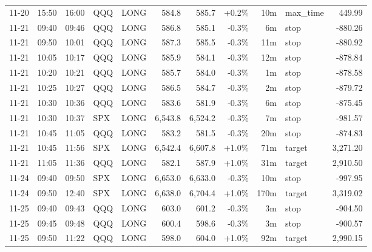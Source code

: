 \documentclass[11pt,a4paper,twoside]{article}
\begin{document}
\begin{center}
\begin{longtable}{>{\color{txtmain}}l l l l l r r r r >{\color{txtmain}}l r}
11-20 & 15:50 & 16:00 & QQQ & LONG & 584.8 & 585.7 & \textcolor{wingreen}{+0.2\%} & 10m & max\_time & \textcolor{wingreen}{449.99} \\
11-21 & 09:40 & 09:46 & QQQ & LONG & 586.8 & 585.1 & \textcolor{lossred}{-0.3\%} & 6m & stop & \textcolor{lossred}{-880.26} \\
11-21 & 09:50 & 10:01 & QQQ & LONG & 587.3 & 585.5 & \textcolor{lossred}{-0.3\%} & 11m & stop & \textcolor{lossred}{-880.92} \\
11-21 & 10:05 & 10:17 & QQQ & LONG & 585.9 & 584.1 & \textcolor{lossred}{-0.3\%} & 12m & stop & \textcolor{lossred}{-878.84} \\
11-21 & 10:20 & 10:21 & QQQ & LONG & 585.7 & 584.0 & \textcolor{lossred}{-0.3\%} & 1m & stop & \textcolor{lossred}{-878.58} \\
11-21 & 10:25 & 10:27 & QQQ & LONG & 586.5 & 584.7 & \textcolor{lossred}{-0.3\%} & 2m & stop & \textcolor{lossred}{-879.72} \\
11-21 & 10:30 & 10:36 & QQQ & LONG & 583.6 & 581.9 & \textcolor{lossred}{-0.3\%} & 6m & stop & \textcolor{lossred}{-875.45} \\
11-21 & 10:30 & 10:37 & SPX & LONG & 6,543.8 & 6,524.2 & \textcolor{lossred}{-0.3\%} & 7m & stop & \textcolor{lossred}{-981.57} \\
11-21 & 10:45 & 11:05 & QQQ & LONG & 583.2 & 581.5 & \textcolor{lossred}{-0.3\%} & 20m & stop & \textcolor{lossred}{-874.83} \\
11-21 & 10:45 & 11:56 & SPX & LONG & 6,542.4 & 6,607.8 & \textcolor{wingreen}{+1.0\%} & 71m & target & \textcolor{wingreen}{3,271.20} \\
11-21 & 11:05 & 11:36 & QQQ & LONG & 582.1 & 587.9 & \textcolor{wingreen}{+1.0\%} & 31m & target & \textcolor{wingreen}{2,910.50} \\
11-24 & 09:40 & 09:50 & SPX & LONG & 6,653.0 & 6,633.0 & \textcolor{lossred}{-0.3\%} & 10m & stop & \textcolor{lossred}{-997.95} \\
11-24 & 09:50 & 12:40 & SPX & LONG & 6,638.0 & 6,704.4 & \textcolor{wingreen}{+1.0\%} & 170m & target & \textcolor{wingreen}{3,319.02} \\
11-25 & 09:40 & 09:43 & QQQ & LONG & 603.0 & 601.2 & \textcolor{lossred}{-0.3\%} & 3m & stop & \textcolor{lossred}{-904.50} \\
11-25 & 09:45 & 09:48 & QQQ & LONG & 600.4 & 598.6 & \textcolor{lossred}{-0.3\%} & 3m & stop & \textcolor{lossred}{-900.57} \\
11-25 & 09:50 & 11:22 & QQQ & LONG & 598.0 & 604.0 & \textcolor{wingreen}{+1.0\%} & 92m & target & \textcolor{wingreen}{2,990.15} \\

\end{longtable}
\end{center}
\end{document}
